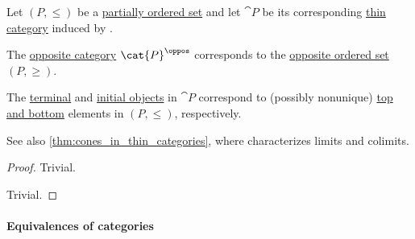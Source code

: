 \begin{proposition}\label{thm:order_category_isomorphism_properties}
  Let \( (P, \leq) \) be a \hyperref[def:partially_ordered_set]{partially ordered set} and let \( \cat{P} \) be its corresponding \hyperref[def:thin_category]{thin category} induced by .

  \begin{thmenum}
     The \hyperref[def:opposite_category]{opposite category} \( \cat{P}^\oppos \) corresponds to the \hyperref[def:partially_ordered_set/opposite]{opposite ordered set} \( (P, \geq) \).

     The \hyperref[def:universal_objects/terminal]{terminal} and \hyperref[def:universal_objects/initial]{initial objects} in \( \cat{P} \) correspond to (possibly nonunique) \hyperref[def:extremal_points/top_and_bottom]{top and bottom} elements in \( (P, \leq) \), respectively.
  \end{thmenum}
\end{proposition}
\begin{comments}
  \item See also \cref{thm:cones_in_thin_categories}, where characterizes limits and colimits.
\end{comments}
\begin{proof}
   Trivial.

   Trivial.
\end{proof}

\paragraph{Equivalences of categories}

